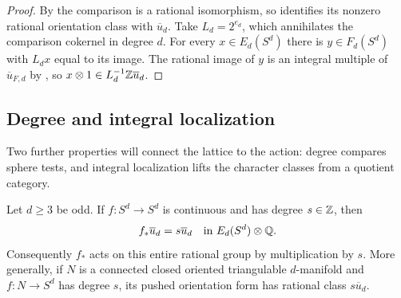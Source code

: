 \begin{proof}
By  the comparison is a rational
isomorphism, so  identifies its
nonzero rational orientation class with $\overline{u}_d$.  Take $L_d=2^{e_d}$,
which annihilates the comparison cokernel in degree $d$.
For every $x\in E_d(S^d)$ there is $y\in F_d(S^d)$ with
$L_dx$ equal to its
image.  The rational image of $y$ is an integral multiple of $\overline{u}_{F,d}$ by
, so
$x\otimes1\in L_d^{-1}\mathbb Z\overline{u}_d$.
\end{proof}

\subsection{Degree and integral localization}

Two further properties will connect the lattice to the action: degree
compares sphere tests, and integral localization lifts the character
classes from a quotient category.

\begin{proposition}
\label{prop:degree-action}
Let $d\geq3$ be odd. If $f:S^d\to S^d$ is continuous and has
degree $s\in\mathbb Z$, then
\[
 f_*\overline{u}_d=s\overline{u}_d\quad\text{in }E_d(S^d)\otimes\mathbb Q.
\]
Consequently $f_*$ acts on this entire rational group by
multiplication by $s$.  More generally, if $N$ is a connected
closed oriented triangulable $d$-manifold and $f:N\to S^d$
has degree $s$, its pushed orientation form has rational class
$s\overline{u}_d$.
\end{proposition}

